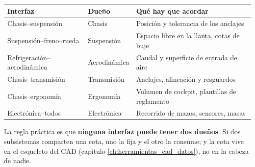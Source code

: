 \begin{center}
\begin{tabularx}{\textwidth}{@{}llX@{}}
\toprule
\textbf{Interfaz} & \textbf{Dueño} & \textbf{Qué hay que acordar} \\
\midrule
Chasis--suspensión & Chasis & Posición y tolerancia de los anclajes \\
Suspensión--freno--rueda & Suspensión & Espacio libre en la llanta, cotas de buje \\
Refrigeración--aerodinámica & Aerodinámica & Caudal y superficie de entrada de aire \\
Chasis--transmisión & Transmisión & Anclajes, alineación y resguardos \\
Chasis--ergonomía & Ergonomía & Volumen de cockpit, plantillas de reglamento \\
Electrónica--todos & Electrónica & Recorrido de mazos, sensores, masas \\
\bottomrule
\end{tabularx}
\end{center}

La regla práctica es que \textbf{ninguna interfaz puede tener dos dueños}. Si dos
subsistemas comparten una cota, uno la fija y el otro la consume; y la cota vive
en el esqueleto del CAD (capítulo \ref{ch:herramientas_cad_datos}), no en la
cabeza de nadie.


